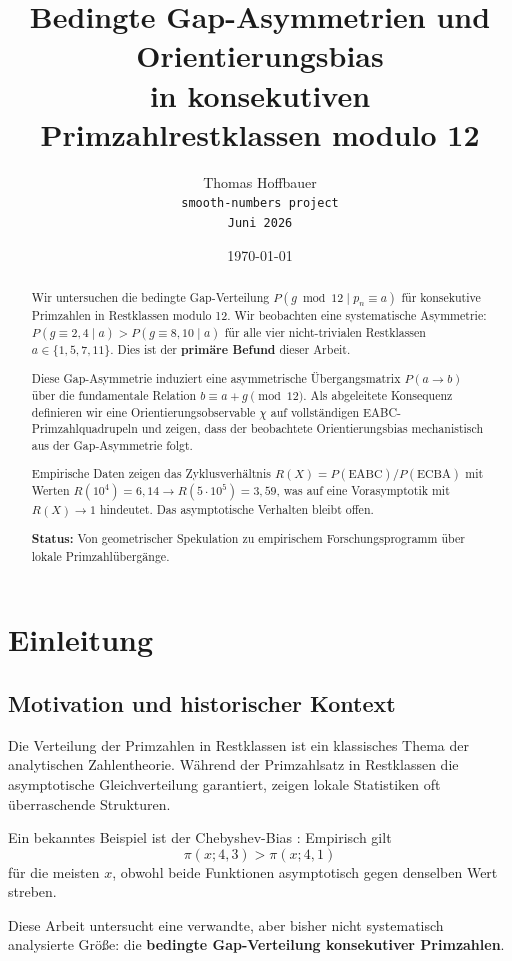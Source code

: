 \documentclass[11pt,a4paper]{article}
\title{Bedingte Gap-Asymmetrien und Orientierungsbias \\
in konsekutiven Primzahlrestklassen modulo 12}
\author{
Thomas Hoffbauer \\
\texttt{smooth-numbers project} \\
\texttt{Juni 2026}
}
\date{\today}
\begin{document}
\maketitle

\begin{abstract}
Wir untersuchen die bedingte Gap-Verteilung $P(g \bmod 12 \mid p_n \equiv a)$ für konsekutive Primzahlen in Restklassen modulo 12. Wir beobachten eine systematische Asymmetrie: $P(g \equiv 2,4 \mid a) > P(g \equiv 8,10 \mid a)$ für alle vier nicht-trivialen Restklassen $a \in \{1, 5, 7, 11\}$. Dies ist der \textbf{primäre Befund} dieser Arbeit.

Diese Gap-Asymmetrie induziert eine asymmetrische Übergangsmatrix $P(a \to b)$ über die fundamentale Relation $b \equiv a + g \pmod{12}$. Als abgeleitete Konsequenz definieren wir eine Orientierungsobservable $\chi$ auf vollständigen EABC-Primzahlquadrupeln und zeigen, dass der beobachtete Orientierungsbias mechanistisch aus der Gap-Asymmetrie folgt.

Empirische Daten zeigen das Zyklusverhältnis $R(X) = P(\text{EABC})/P(\text{ECBA})$ mit Werten $R(10^4) = 6{,}14 \to R(5 \cdot 10^5) = 3{,}59$, was auf eine Vorasymptotik mit $R(X) \to 1$ hindeutet. Das asymptotische Verhalten bleibt offen.

\textbf{Status:} Von geometrischer Spekulation zu empirischem Forschungsprogramm über lokale Primzahlübergänge.
\end{abstract}

\section{Einleitung}

\subsection{Motivation und historischer Kontext}

Die Verteilung der Primzahlen in Restklassen ist ein klassisches Thema der analytischen Zahlentheorie. Während der Primzahlsatz in Restklassen \cite{davenport} die asymptotische Gleichverteilung garantiert, zeigen lokale Statistiken oft überraschende Strukturen.

Ein bekanntes Beispiel ist der Chebyshev-Bias \cite{rubinstein1994}: Empirisch gilt
\[
\pi(x; 4, 3) > \pi(x; 4, 1)
\]
für die meisten $x$, obwohl beide Funktionen asymptotisch gegen denselben Wert streben.

Diese Arbeit untersucht eine verwandte, aber bisher nicht systematisch analysierte Größe: die \textbf{bedingte Gap-Verteilung konsekutiver Primzahlen}.
\end{document}
